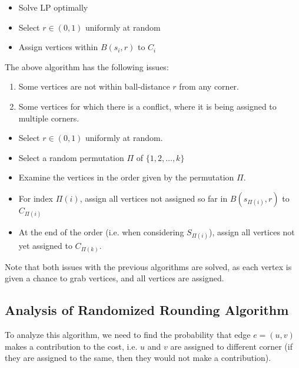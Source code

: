 \documentclass[../main/main.tex]{subfiles}
\begin{document}
\begin{algo} 
	\begin{itemize}
		\item Solve LP optimally
	\item Select $r\in (0,1)$ uniformly at random
\item Assign vertices within $B(s_i,r)$ to $C_i$
\end{itemize}
\end{algo}
\begin{remark}
	The above algorithm has the following issues: 
	\begin{enumerate}
		\item Some vertices are not within ball-distance $r$ from any corner.
		\item Some vertices for which there is a conflict, where it is being assigned to multiple corners.
	\end{enumerate}
\end{remark}
\begin{algo}
	\begin{itemize}
		\item Select $r\in (0,1)$ uniformly at random.
		\item Select a random permutation $\Pi$ of $\{1,2,\ldots,k\} $ 
		\item Examine the vertices in the order given by the permutation $\Pi$.
		\item For index  $\Pi(i)$, assign all vertices not assigned so far in $B(s_{\Pi(i)},r)$ to $C_{\Pi(i)}$
		\item At the end of the order (i.e. when considering  $S_{\Pi(i)}$), assign all vertices not yet assigned to  $C_{\Pi(k)}$.
	\end{itemize}

\end{algo}
\begin{remark}
	Note that both issues with the previous algorithms are solved, as each vertex is given a chance to grab vertices, and all vertices are assigned.
\end{remark}
\subsection{Analysis of Randomized Rounding Algorithm}
To analyze this algorithm, we need to find the probability that  edge $e=(u,v)$ makes a contribution to the cost, i.e. $u$ and $v$ are assigned to different corner (if they are assigned to the same, then they would not make a contribution).\\
\end{document}
